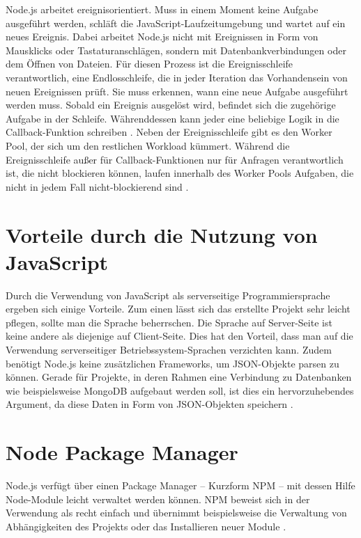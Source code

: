 Node.js arbeitet ereignisorientiert. Muss in einem Moment keine Aufgabe ausgeführt werden, schläft die JavaScript-Laufzeitumgebung und wartet auf ein neues Ereignis. Dabei arbeitet Node.js nicht mit Ereignissen in Form von Mausklicks oder Tastaturanschlägen, sondern mit Datenbankverbindungen oder dem Öffnen von Dateien. 
Für diesen Prozess ist die Ereignisschleife verantwortlich, eine Endlosschleife, die in jeder Iteration das Vorhandensein von neuen Ereignissen prüft. Sie muss erkennen, wann eine neue Aufgabe ausgeführt werden muss. Sobald ein Ereignis ausgelöst wird, befindet sich die zugehörige Aufgabe in der Schleife. Währenddessen kann jeder eine beliebige Logik in die Callback-Funktion schreiben \cite[S.3]{neins}.
Neben der Ereignisschleife gibt es den Worker Pool, der sich um den restlichen Workload kümmert. Während die Ereignisschleife außer für Callback-Funktionen nur für Anfragen verantwortlich ist, die nicht blockieren können, laufen innerhalb des Worker Pools Aufgaben, die nicht in jedem Fall nicht-blockierend sind \cite{dienstag}. 

\section{Vorteile durch die Nutzung von JavaScript}

Durch die Verwendung von JavaScript als serverseitige Programmiersprache ergeben sich einige Vorteile. Zum einen lässt sich das erstellte Projekt sehr leicht pflegen, sollte man die Sprache beherrschen. Die Sprache auf Server-Seite ist keine andere als diejenige auf Client-Seite. Dies hat den Vorteil, dass man auf die Verwendung serverseitiger Betriebssystem-Sprachen verzichten kann.
Zudem benötigt Node.js keine zusätzlichen Frameworks, um JSON-Objekte parsen zu können. Gerade für Projekte, in deren Rahmen eine Verbindung zu Datenbanken wie beispielsweise MongoDB aufgebaut werden soll, ist dies ein hervorzuhebendes Argument, da diese Daten in Form von JSON-Objekten speichern \cite[S.3]{neins}. 

\section{Node Package Manager}
Node.js verfügt über einen Package Manager – Kurzform NPM – mit dessen Hilfe Node-Module leicht verwaltet werden können. NPM beweist sich in der Verwendung als recht einfach und übernimmt beispielsweise die Verwaltung von Abhängigkeiten des Projekts oder das Installieren neuer Module \cite[S.10]{neins}. 

